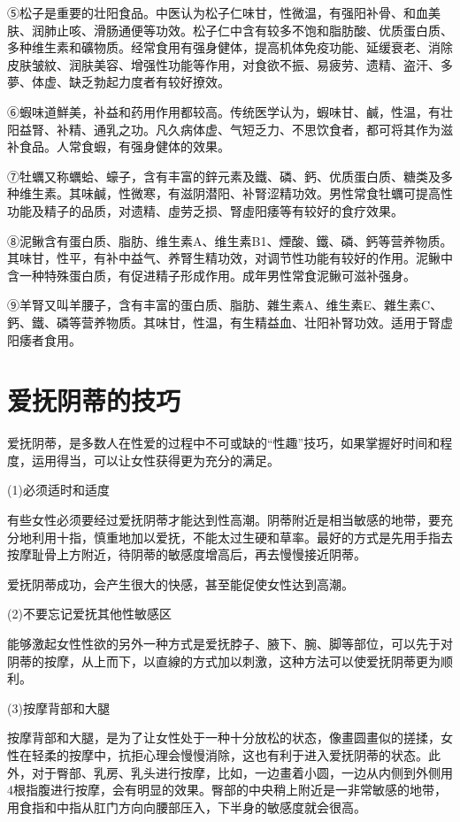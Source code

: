 \documentclass[12pt,UTF8]{ctexbook}
\begin{document}
⑤松子是重要的壮阳食品。中医认为松子仁味甘，性微温，有强阳补骨、和血美肤、润肺止咳、滑肠通便等功效。松子仁中含有较多不饱和脂肪酸、优质蛋白质、多种维生素和礦物质。经常食用有强身健体，提高机体免疫功能、延缓衰老、消除皮肤皱紋、润肤美容、增强性功能等作用，对食欲不振、易疲劳、遗精、盗汗、多夢、体虚、缺乏勃起力度者有较好撩效。

⑥蝦味道鮮美，补益和药用作用都较高。传统医学认为，蝦味甘、鹹，性温，有壮阳益腎、补精、通乳之功。凡久病体虚、气短乏力、不思饮食者，都可将其作为滋补食品。人常食蝦，有强身健体的效果。

⑦牡蠣又称蠣蛤、蠔子，含有丰富的鋅元素及鐵、磷、鈣、优质蛋白质、糖类及多种维生素。其味鹹，性微寒，有滋阴潜阳、补腎涩精功效。男性常食牡蠣可提高性功能及精子的品质，对遗精、虛劳乏损、腎虛阳痿等有较好的食疗效果。

⑧泥鳅含有蛋白质、脂肪、维生素A、维生素B1、煙酸、鐵、磷、鈣等营养物质。其味甘，性平，有补中益气、养腎生精功效，对调节性功能有较好的作用。泥鳅中含一种特殊蛋白质，有促进精子形成作用。成年男性常食泥鳅可滋补强身。

⑨羊腎又叫羊腰子，含有丰富的蛋白质、脂肪、雜生素A、维生素E、雜生素C、鈣、鐵、磷等营养物质。其味甘，性温，有生精益血、壮阳补腎功效。适用于腎虚阳痿者食用。

\section{爱抚阴蒂的技巧}

爱抚阴蒂，是多数人在性爱的过程中不可或缺的“性趣”技巧，如果掌握好时间和程度，运用得当，可以让女性获得更为充分的满足。

(1)必须适时和适度

有些女性必须要经过爱抚阴蒂才能达到性高潮。阴蒂附近是相当敏感的地带，要充分地利用十指，慎重地加以爱抚，不能太过生硬和草率。最好的方式是先用手指去按摩耻骨上方附近，待阴蒂的敏感度增高后，再去慢慢接近阴蒂。

爱抚阴蒂成功，会产生很大的快感，甚至能促使女性达到高潮。

(2)不要忘记爱抚其他性敏感区

能够激起女性性欲的另外一种方式是爱抚脖子、腋下、腕、脚等部位，可以先于对阴蒂的按摩，从上而下，以直線的方式加以刺激，这种方法可以使爱抚阴蒂更为顺利。

(3)按摩背部和大腿

按摩背部和大腿，是为了让女性处于一种十分放松的状态，像畫圆畫似的搓揉，女性在轻柔的按摩中，抗拒心理会慢慢消除，这也有利于进入爱抚阴蒂的状态。此外，对于臀部、乳房、乳头进行按摩，比如，一边畫着小圆，一边从内侧到外侧用4根指腹进行按摩，会有明显的效果。臀部的中央稍上附近是一非常敏感的地带，用食指和中指从肛门方向向腰部压入，下半身的敏感度就会很高。
\end{document}
